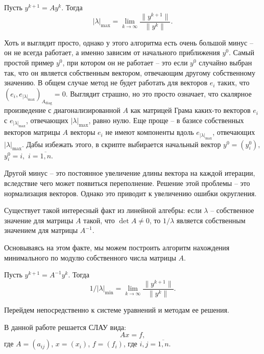 		Пусть $y^{k+1} = Ay^k$. Тогда 
		\begin{equation*}
			|\lambda|_\text{max} = \lim\limits_{k \rightarrow \infty}\frac{\|y^{k+1}\|}{\|y^k\|}.
		\end{equation*}
	
		Хоть и выглядит просто, однако у этого алгоритма есть очень большой минус -- он не всегда работает, а именно зависим от начального приближения $y^0$. Самый простой пример $y^0$, при котором он не работает -- это если $y^0$ случайно выбран так, что он является собственным вектором, отвечающим другому собственному значению. В общем случае метод не будет работать для векторов $e_i$ таких, что $(e_i, e_{|\lambda|_\text{max}})_{A_\text{diag}} = 0$. Выглядит страшно, но это просто означает, что скалярное произведение с диагонализированной $A$ как матрицей Грама каких-то векторов $e_i$ с $e_{|\lambda|_\text{max}}$, отвечающих $|\lambda|_\text{max}$, равно нулю. Еще проще -- в базисе собственных векторов матрицы $A$ векторы $e_i$ не имеют компоненты вдоль $e_{|\lambda|_\text{max}}$, отвечающих $|\lambda|_\text{max}$. Дабы избежать этого, в скрипте выбирается начальный вектор $y^0 = (y_i^0),$ $y_i^0 = i,$ $i = \overline{1, n}$. 
		
		Другой минус -- это постоянное увеличение длины вектора на каждой итерации, вследствие чего может появиться переполнение. Решение этой проблемы -- это нормализация векторов. Однако это приводит к увеличению ошибки округления. 
		
		
		Существует такой интересный факт из линейной алгебры: если $\lambda$ -- собственное значение для матрицы $A$ такой, что $\det{A} \neq 0$, то $1/\lambda$ является собственным значением для матрицы $A^{-1}$.
		
		Основываясь на этом факте, мы можем построить алгоритм нахождения минимального по модулю собственного числа матрицы $A$. 
		
		Пусть $y^{k+1} = A^{-1}y^k$. Тогда
		\begin{equation*}
			1/|\lambda|_\text{min} = \lim\limits_{k \rightarrow \infty}\frac{\|y^{k+1}\|}{\|y^k\|}.
		\end{equation*} 
		
		
		Перейдем непосредственно к системе уравнений и методам ее решения.
		
			
		
		\newpage
		В данной работе решается СЛАУ вида:
		\begin{equation*}
			Ax = f,
		\end{equation*}
		где $A = (a_{ij})$, $x = (x_i)$, $f = (f_i)$, где $i, j = \overline{1, n}$.
		
